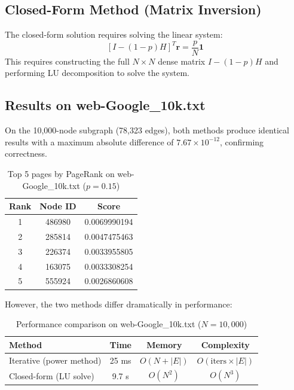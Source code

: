 \documentclass{article}
\begin{document}
\subsection{Closed-Form Method (Matrix Inversion)}

The closed-form solution requires solving the linear system:
\begin{equation}
    \left[I - (1-p)H\right]^T \mathbf{r} = \frac{p}{N} \mathbf{1}
\end{equation}
This requires constructing the full $N \times N$ dense matrix $I - (1-p)H$ and performing LU decomposition to solve the system.

\subsection{Results on web-Google\_10k.txt}

On the 10,000-node subgraph (78,323 edges), both methods produce identical results with a maximum absolute difference of $7.67 \times 10^{-12}$, confirming correctness.

\begin{table}[h]
\centering
\begin{tabular}{|c|c|c|}
\hline
\textbf{Rank} & \textbf{Node ID} & \textbf{Score} \\
\hline
1 & 486980 & 0.0069990194 \\
2 & 285814 & 0.0047475463 \\
3 & 226374 & 0.0033955805 \\
4 & 163075 & 0.0033308254 \\
5 & 555924 & 0.0026860608 \\
\hline
\end{tabular}
\caption{Top 5 pages by PageRank on web-Google\_10k.txt ($p = 0.15$)}
\end{table}

However, the two methods differ dramatically in performance:

\begin{table}[h]
\centering
\begin{tabular}{|l|c|c|c|}
\hline
\textbf{Method} & \textbf{Time} & \textbf{Memory} & \textbf{Complexity} \\
\hline
Iterative (power method) & 25 ms & $O(N + |E|)$ & $O(\text{iters} \times |E|)$ \\
Closed-form (LU solve) & 9.7 s & $O(N^2)$ & $O(N^3)$ \\
\hline
\end{tabular}
\caption{Performance comparison on web-Google\_10k.txt ($N = 10{,}000$)}
\end{table}
\end{document}
